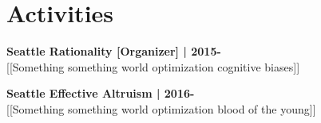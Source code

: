 \section{Activities}

\textbf{Seattle Rationality [Organizer] | 2015-}\\
{[[}Something something world optimization cognitive biases{]]}
\sectionsep

\textbf{Seattle Effective Altruism | 2016-}\\
{[[}Something something world optimization blood of the young{]]}
\sectionsep
